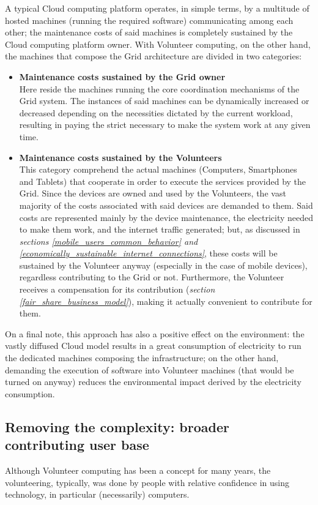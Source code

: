 A typical Cloud computing platform operates, in simple terms, by a multitude of hosted machines (running the required software) communicating among each other; the maintenance costs of said machines is completely sustained by the Cloud computing platform owner. With Volunteer computing, on the other hand, the machines that compose the Grid architecture are divided in two categories:
\begin{itemize}
    \item \textbf{Maintenance costs sustained by the Grid owner}\\
    Here reside the machines running the core coordination mechanisms of the Grid system. The instances of said machines can be dynamically increased or decreased depending on the necessities dictated by the current workload, resulting in paying the strict necessary to make the system work at any given time.
    \item \textbf{Maintenance costs sustained by the Volunteers}\\
    This category comprehend the actual machines (Computers, Smartphones and Tablets) that cooperate in order to execute the services provided by the Grid. Since the devices are owned and used by the Volunteers, the vast majority of the costs associated with said devices are demanded to them. Said costs are represented mainly by the device maintenance, the electricity needed to make them work, and the internet traffic generated; but, as discussed in \textit{sections \ref{mobile_users_common_behavior} and \ref{economically_sustainable_internet_connections}}, these costs will be sustained by the Volunteer anyway (especially in the case of mobile devices), regardless contributing to the Grid or not. Furthermore, the Volunteer receives a compensation for its contribution (\textit{section \ref{fair_share_business_model}}), making it actually convenient to contribute for them.
\end{itemize}

On a final note, this approach has also a positive effect on the environment: the vastly diffused Cloud model results in a great consumption of electricity to run the dedicated machines composing the infrastructure; on the other hand, demanding the execution of software into Volunteer machines (that would be turned on anyway) reduces the environmental impact derived by the electricity consumption.

\subsection{Removing the complexity: broader contributing user base}
Although Volunteer computing has been a concept for many years, the volunteering, typically, was done by people with relative confidence in using technology, in particular (necessarily) computers.

